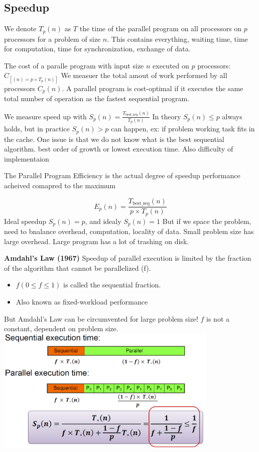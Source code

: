 \documentclass{article}
\begin{document}
\subsection{Speedup}
We denote $T_p \left( n \right)$ as $T$ the time of the parallel program on all processors on $p$ processors for a problem of size $n$.
This contains everything, waiting time, time for computation, time for synchronization, exchange of data.

The cost of a paralle program with input size $n$ executed on $p$ processors: $C_[ \left( n \right) = p \times T_p \left( n \right)]$
We measuer the total amout of work performed by all processors $C_p\left( n \right)$.
A parallel program is cost-optimal if it executes the same total number of operation as the fastest sequential program.

We measure speed up with $S_p \left( n \right) = \frac{T_\text{best\_seq} \left( n \right)}{T_p \left( n \right)}$
In theory $S_p \left( n \right) \leq p$ always holds,
but in practice $S_p \left( n \right) > p$ can happen, ex: if problem working task fits in the cache.
One issue is that we do not know what is the best sequential algorithm. best order of growth or lowest execution time. Also difficulty of implementaion

The Parallel Program Efficiency is the actual degree of speedup performance acheived comapred to the maximum

\[
    E_p \left( n \right) = \frac{T_\text{best\_seq} \left( n \right)}{p \times T_p \left( n \right)}
\]
Ideal speedup $S_p\left( n \right) = p$, and idealy $S_p \left( n \right) = 1$
But if we space the problem, need to bnalance overhead, computation, locality of data. Small problem size has large overhead. Large program has a lot of trashing on disk.

\textbf{Amdahl's Law (1967)}
Speedup of parallel execution is limited by the fraction of the algorithm that cannot be parallelized (f).
\begin{itemize}
    \item $f \left( 0 \leq f \leq 1 \right)$ is called the sequential fraction.
    \item Also known as fixed-workload performance
\end{itemize}
But Amdahl's Law can be circumvented for large problem size! $f$ is not a constant, dependent on problem size.
\includegraphics[width=0.8\textwidth]{l5_amdahl_law.png}
\end{document}
